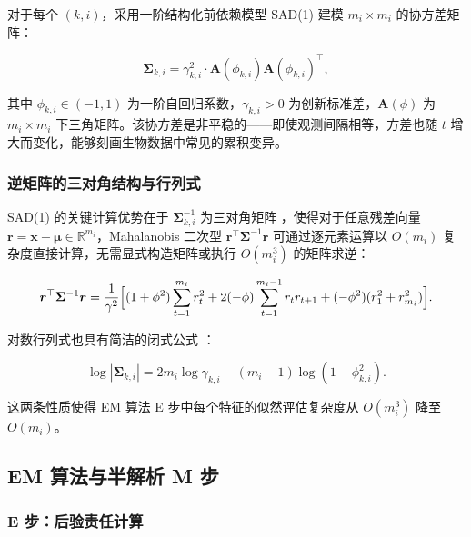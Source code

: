 \documentclass[12pt,a4paper]{article}
\begin{document}
对于每个 $(k,i)$，采用一阶结构化前依赖模型 SAD(1) \cite{nunez1997longitudinal,zhao2005non,zhao2005structured} 建模 $m_i \times m_i$ 的协方差矩阵：

\begin{equation}\label{eq:sad_decomp}
    \bm{\Sigma}_{k,i} = \gamma_{k,i}^2 \cdot \bm{A}(\phi_{k,i}) \bm{A}(\phi_{k,i})^\top,
\end{equation}

其中 $\phi_{k,i} \in (-1, 1)$ 为一阶自回归系数，$\gamma_{k,i} > 0$ 为创新标准差，$\bm{A}(\phi)$ 为 $m_i \times m_i$ 下三角矩阵。该协方差是非平稳的——即使观测间隔相等，方差也随 $t$ 增大而变化，能够刻画生物数据中常见的累积变异。

\subsubsection{逆矩阵的三对角结构与行列式}

SAD(1) 的关键计算优势在于 $\bm{\Sigma}_{k,i}^{-1}$ 为三对角矩阵 \cite{nunez1997longitudinal}，使得对于任意残差向量 $\bm{r} = \bm{x} - \bm{\mu} \in \mathbb{R}^{m_i}$，Mahalanobis 二次型 $\bm{r}^\top \bm{\Sigma}^{-1} \bm{r}$ 可通过逐元素运算以 $O(m_i)$ 复杂度直接计算，无需显式构造矩阵或执行 $O(m_i^3)$ 的矩阵求逆：

\begin{equation}\label{eq:quad_form}
    \bm{r}^\top \bm{\Sigma}^{-1} \bm{r} =
    \frac{1}{\gamma^2} \Bigl[
        (1 + \phi^2) \sum_{t=1}^{m_i} r_t^2
        + 2(-\phi) \sum_{t=1}^{m_i-1} r_t r_{t+1}
        + (-\phi^2) (r_1^2 + r_{m_i}^2)
    \Bigr].
\end{equation}

对数行列式也具有简洁的闭式公式 \cite{nunez1997longitudinal}：

\begin{equation}\label{eq:logdet}
    \log|\bm{\Sigma}_{k,i}| = 2 m_i \log \gamma_{k,i} - (m_i - 1) \log(1 - \phi_{k,i}^2).
\end{equation}

这两条性质使得 EM 算法 E 步中每个特征的似然评估复杂度从 $O(m_i^3)$ 降至 $O(m_i)$。

\subsection{EM 算法与半解析 M 步}

\subsubsection{E 步：后验责任计算}
\end{document}
